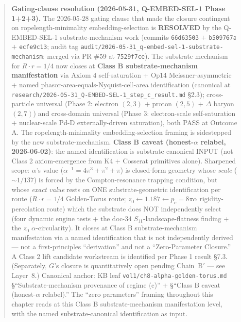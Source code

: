\begin{quote}
\textbf{Gating-clause resolution (2026-05-31, Q-EMBED-SEL-1 Phase 1+2+3).} The 2026-05-28 gating clause that made the closure contingent on ropelength-minimality embedding-selection is \textbf{RESOLVED} by the Q-EMBED-SEL-1 substrate-mechanism work (commits \texttt{66d63503} $+$ \texttt{b509767a} $+$ \texttt{ecfe9c13}; audit tag \texttt{audit/2026-05-31\_q-embed-sel-1-substrate-mechanism}; merged via PR \#59 at \texttt{7529f7ce}). The substrate-mechanism for $R \cdot r = 1/4$ now closes at \textbf{Class B substrate-mechanism manifestation} via Axiom 4 self-saturation + Op14 Meissner-asymmetric + named phasor-area-equals-Nyquist-cell-area identification (canonical at \texttt{research/2026-05-31\_Q-EMBED-SEL-1\_step\_c\_result.md} \S2.3); cross-particle universal (Phase 2: electron $(2,3)$ + proton $(2,5)$ + $\Delta$ baryon $(2,7)$) and cross-domain universal (Phase 3: electron-scale self-saturation + nuclear-scale Pd-D externally-driven saturation), both PASS at Outcome A. The ropelength-minimality embedding-selection framing is sidestepped by the new substrate-mechanism. \textbf{Class B caveat (honest-$\alpha$ relabel, 2026-06-02)}: the named identification is substrate-canonical INPUT (not Class 2 axiom-emergence from K4 $+$ Cosserat primitives alone). Sharpened scope: $\alpha$'s value ($\alpha^{-1} = 4\pi^3 + \pi^2 + \pi$) is closed-form geometry whose \emph{scale} ($\sim 1/137$) is forced by the Compton-resonance trapping condition, but whose \emph{exact value} rests on ONE substrate-geometric identification per route ($R \cdot r = 1/4$ Golden-Torus route; $z_0 \leftarrow 1.187 \leftarrow p_c = 8\pi\alpha$ rigidity-percolation route) which the substrate does NOT independently select (four dynamic engine tests + the doc-34 $S_{11}$-landscape-flatness finding + the $z_0$ $\alpha$-circularity). It closes at Class B substrate-mechanism manifestation via a named identification that is not independently derived --- not a first-principles ``derivation'' and not a ``Zero-Parameter Closure.'' A Class 2 lift candidate workstream is identified per Phase 1 result \S7.3. (Separately, $G$'s closure is quantitatively open pending Chain~B$'$ --- see Layer~8.) Canonical anchor: KB leaf \texttt{vol1/ch8-alpha-golden-torus.md} \S``Substrate-mechanism provenance of regime (c)'' $+$ \S``Class B caveat (honest-$\alpha$ relabel).'' The ``zero parameters'' framing throughout this chapter reads at this Class B substrate-mechanism manifestation level, with the named substrate-canonical identification as input.
\end{quote}

